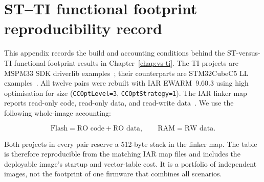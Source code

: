\pagebreak

\section{ST--TI functional footprint reproducibility record}
\label{sec:appendix-ti-functional-footprint}

This appendix records the build and accounting conditions behind the ST-versus-TI functional
footprint results in Chapter~\ref{chap:vs-ti}. The TI projects are MSPM33 SDK driverlib
examples~\cite{ti-mspm33-sdk}; their counterparts are STM32CubeC5 LL examples~\cite{stm32cubec5-sw}.
All twelve pairs were rebuilt with IAR EWARM~9.60.3 using high optimisation for size
(\texttt{CCOptLevel=3}, \texttt{CCOptStrategy=1}). The IAR linker map reports read-only code,
read-only data, and read-write data~\cite{iar-ewarm}. We use the following whole-image accounting:

\[
\text{Flash} = \text{RO code} + \text{RO data}, \qquad
\text{RAM} = \text{RW data}.
\]

Both projects in every pair reserve a 512-byte stack in the linker map. The table is therefore
reproducible from the matching IAR map files and includes the deployable image's startup and
vector-table cost. It is a portfolio of independent images, not the footprint of one firmware
that combines all scenarios.

